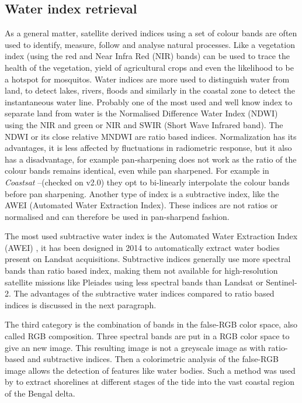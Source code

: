 \documentclass[remotesensing,article,submit,pdftex,moreauthors]{Definitions/mdpi}
\begin{document}
\subsection{Water index retrieval}
As a general matter, satellite derived indices using a set of colour bands are often used to identify, measure, follow and analyse natural processes. Like a vegetation index (using the red and Near Infra Red (NIR) bands) can be used to trace the health of the vegetation, yield of agricultural crops and even the likelihood to be a hotspot for mosquitos. Water indices are more used to distinguish water from land, to detect lakes, rivers, floods and similarly in the coastal zone to detect the instantaneous water line. Probably one of the most used and well know index to separate land from water is the Normalised Difference Water Index (NDWI) using the NIR and green or NIR and SWIR (Short Wave Infrared band). The NDWI or its close relative MNDWI are ratio based indices. Normalization has its advantages, it is less affected by fluctuations in radiometric response, but it also has a disadvantage, for example pan-sharpening does not work as the ratio of the colour bands remains identical, even while pan sharpened. For example in \textit{Coastsat} --(checked on v2.0) they opt to bi-linearly interpolate the colour bands before pan sharpening. Another type of index is a subtractive index, like the AWEI (Automated Water Extraction Index). These indices are not ratios or normalised and can therefore be used in pan-sharpend fashion. 




The most used subtractive water index is the Automated Water Extraction Index (AWEI) \citep{FEYISA201423}, it has been designed in 2014 to automatically extract water bodies present on Landsat acquisitions.
Subtractive indices generally use more spectral bands than ratio based index, making them not available for high-resolution satellite missions like Pleiades using less spectral bands than Landsat or Sentinel-2.
The advantages of the subtractive water indices compared to ratio based indices is discussed in the next paragraph.








The third category is the combination of bands in the false-RGB color space, also called RGB composition.
Three spectral bands are put in a RGB color space to give an new image.
This resulting image is not a greyscale image as with ratio-based and subtractive indices.
Then a colorimetric analysis of the false-RGB image allows the detection of features like water bodies.\citep{PEKEL2014704}
Such a method was used by \citep{Khan2019} to extract shorelines at different stages of the tide into the vast coastal region of the Bengal delta. %
\par
\end{document}
